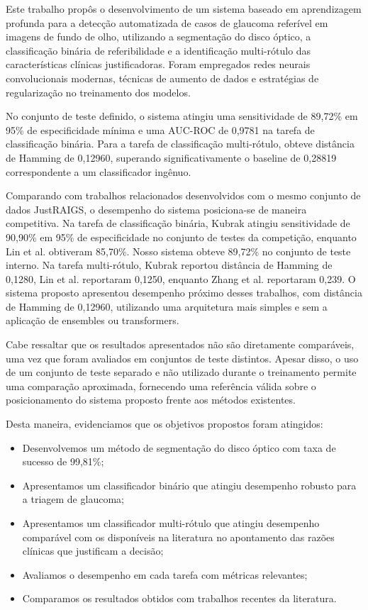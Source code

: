 \documentclass[12pt]{article}
\begin{document}
Este trabalho propôs o desenvolvimento de um sistema baseado em aprendizagem profunda para a detecção automatizada de casos de glaucoma referível em imagens de fundo de olho, utilizando a segmentação do disco óptico, a classificação binária de referibilidade e a identificação multi-rótulo das características clínicas justificadoras. Foram empregados redes neurais convolucionais modernas, técnicas de aumento de dados e estratégias de regularização no treinamento dos modelos.

No conjunto de teste definido, o sistema atingiu uma sensitividade de 89,72\% em 95\% de especificidade mínima e uma AUC-ROC de 0,9781 na tarefa de classificação binária. Para a tarefa de classificação multi-rótulo, obteve distância de Hamming de 0,12960, superando significativamente o baseline de 0,28819 correspondente a um classificador ingênuo.

Comparando com trabalhos relacionados desenvolvidos com o mesmo conjunto de dados JustRAIGS, o desempenho do sistema posiciona-se de maneira competitiva.  
Na tarefa de classificação binária, Kubrak \cite{justraigs_kubrak} atingiu sensitividade de 90,90\% em 95\% de especificidade no conjunto de testes da competição, enquanto Lin et al. \cite{justraigs_hu_lin} obtiveram 85,70\%. Nosso sistema obteve 89,72\% no conjunto de teste interno.
Na tarefa multi-rótulo, Kubrak reportou distância de Hamming de 0,1280, Lin et al. \cite{justraigs_hu_lin} reportaram 0,1250, enquanto Zhang et al. \cite{justraigs_zhang} reportaram 0,239. O sistema proposto apresentou desempenho próximo desses trabalhos, com distância de Hamming de 0,12960, utilizando uma arquitetura mais simples e sem a aplicação de ensembles ou transformers.

Cabe ressaltar que os resultados apresentados não são diretamente comparáveis, uma vez que foram avaliados em conjuntos de teste distintos. Apesar disso, o uso de um conjunto de teste separado e não utilizado durante o treinamento permite uma comparação aproximada, fornecendo uma referência válida sobre o posicionamento do sistema proposto frente aos métodos existentes.

Desta maneira, evidenciamos que os objetivos propostos foram atingidos:
\begin{itemize}[noitemsep]
    \item Desenvolvemos um método de segmentação do disco óptico com taxa de sucesso de 99,81\%;
    \item Apresentamos um classificador binário que atingiu desempenho robusto para a triagem de glaucoma;
    \item Apresentamos um classificador multi-rótulo que atingiu desempenho comparável com os disponíveis na literatura no apontamento das razões clínicas que justificam a decisão;
    \item Avaliamos o desempenho em cada tarefa com métricas relevantes;
    \item Comparamos os resultados obtidos com trabalhos recentes da literatura.
\end{itemize}
\end{document}
